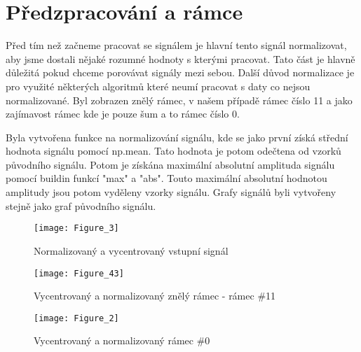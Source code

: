 \section{Předzpracování a rámce}

Před tím než začneme pracovat se signálem je hlavní tento signál normalizovat, aby jsme dostali nějaké rozumné hodnoty s kterými pracovat.
Tato část je hlavně důležitá pokud chceme porovávat signály mezi sebou. Další důvod normalizace je pro využité některých algoritmů které neumí pracovat s daty co nejsou normalizované.
Byl zobrazen znělý rámec, v našem případě rámec číslo 11 a jako zajímavost rámec kde je pouze šum a to rámec číslo 0.

Byla vytvořena funkce na normalizování signálu, kde se jako první získá střední hodnota signálu pomocí np.mean. 
Tato hodnota je potom odečtena od vzorků původního signálu.
Potom je získána maximální absolutní amplituda signálu pomocí buildin funkcí "max" a "abs".
Touto maximální absolutní hodnotou amplitudy jsou potom vyděleny vzorky signálu.
Grafy signálů byli vytvořeny stejně jako graf původního signálu.

\begin{figure}[H] 
	\centering
	\texttt{[image: Figure\_3]}
	\caption{Normalizovaný a vycentrovaný vstupní signál}
\end{figure}

\begin{figure}[H] 
	\centering
	\texttt{[image: Figure\_43]}
	\caption{Vycentrovaný a normalizovaný znělý rámec - rámec \#11}
\end{figure}

\begin{figure}[H] 
	\centering
	\texttt{[image: Figure\_2]}
	\caption{Vycentrovaný a normalizovaný rámec \#0}
\end{figure}